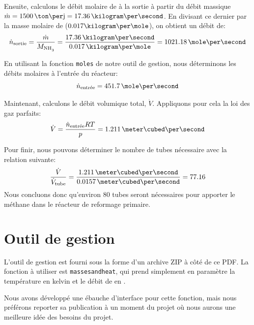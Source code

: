 \documentclass[a4paper,12pt]{article}
\begin{document}
Ensuite, calculons le débit molaire de  à la sortie
à partir du débit massique $\dot{m} = 1500\,\ton\per\jour = 17.36\,\kilogram\per\second$.
En divisant ce dernier par la masse molaire de  ($0.017\kilogram\per\mole$),
on obtient un débit de:
\begin{equation*}
    \dot{n}\ind{sortie} = \frac{\dot{m}}{M_{\ce{NH3}}}
    = \frac{17.36\,\kilogram\per\second}{0.017\,\kilogram\per\mole}
    = 1021.18\,\mole\per\second
\end{equation*}

En utilisant la fonction \texttt{moles} de notre outil de gestion,
nous déterminons les débits molaires à l'entrée du réacteur:
\begin{equation*}
    \dot{n}\ind{entrée} = 451.7\,\mole\per\second
\end{equation*}

Maintenant, calculons le débit volumique total, $\dot{V}$.
Appliquons pour cela la loi des gaz parfaits:
\begin{equation*}
    \dot{V} = \frac{\dot{n}\ind{entrée}RT}{p} = 1.211\,\meter\cubed\per\second
\end{equation*}

Pour finir, nous pouvons déterminer
le nombre de tubes nécessaire avec la relation suivante:
\begin{equation*}
    \frac{\dot{V}}{\dot{V}\ind{tube}}
    = \frac{1.211\,\meter\cubed\per\second}{0.0157\,\meter\cubed\per\second} = 77.16
\end{equation*}
Nous concluons donc qu'environ 80 tubes seront nécessaires pour apporter le méthane
dans le réacteur de reformage primaire.

\section{Outil de gestion}

L'outil de gestion est fourni sous la forme d'un archive ZIP à côté de ce PDF.
La fonction à utiliser est \texttt{masses\textunderscore and\textunderscore heat},
qui prend simplement en paramètre la température en kelvin et le débit
de  en \kilogram\per\second.

Nous avons développé une ébauche d'interface pour cette fonction,
mais nous préférons reporter sa publication à un moment du projet où nous aurons
une meilleure idée des besoins du projet.

\printbibliography[heading=bibintoc]
\end{document}
